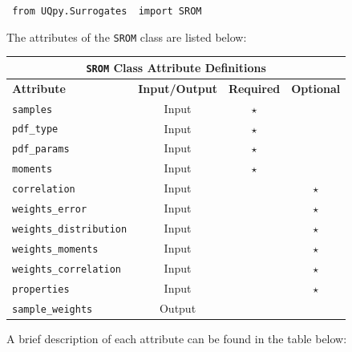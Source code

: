 \vspace{4mm}
\texttt{{\color{blue} from} \texttt{UQpy.Surrogates} {\color{blue} import} SROM}
\vspace{4mm}

\noindent
The attributes of the \texttt{SROM} class are listed below:

\begin{center}
	\begin{tabular}{ |l|c|c|c| } 
				\hline
		\multicolumn{4}{|c|}{\texttt{SROM} Class Attribute Definitions} \\
		\hline
		\textbf{Attribute} & \textbf{Input/Output} & \textbf{Required} & \textbf{Optional} \\
		\hline
		\texttt{samples} & Input & $\star$ &   \\ 
		\hline
        \texttt{pdf\_type}& Input & $\star$ &    \\ 
		\hline
        \texttt{pdf\_params}& Input & $\star$ &    \\ 
		\hline
        \texttt{moments}& Input & $\star$ &    \\ 
		\hline
        \texttt{correlation} & Input & & $\star$   \\ 
		\hline
        \texttt{weights\_error} & Input &  & $\star$  \\ 
		\hline
		\texttt{weights\_distribution}& Input &  &  $\star$  \\ 
		\hline
		\texttt{weights\_moments} & Input &  &  $\star$ \\ 
		\hline
		\texttt{weights\_correlation} & Input  & &  $\star$  \\ 
		\hline
        \texttt{properties} & Input & & $\star$   \\ 
		\hline
		\texttt{sample\_weights} & Output &  &   \\ 
		\hline
	\end{tabular}%
\end{center}


\noindent
A brief description of each attribute can be found in the table below:

